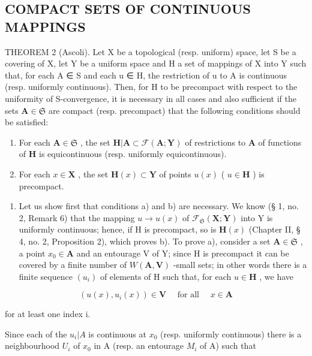 \subsection{COMPACT SETS OF CONTINUOUS MAPPINGS}

THEOREM 2 (Ascoli). Let X be a topological (resp. uniform) space, let S be a covering of X, let Y be a uniform space and H a set of mappings of X into Y such that, for each A ∈ S and each u ∈ H, the restriction of u to A is continuous (resp. uniformly continuous). Then, for H to be precompact with respect to the uniformity of S-convergence, it is necessary in all cases and also sufficient if the sets \(\mathbf{A} \in \mathfrak{S}\) are compact (resp. precompact) that the following conditions should be satisfied:

\begin{enumerate}
\def\labelenumi{\alph{enumi})}
\item
  For each \(\mathbf{A} \in \mathfrak{S}\) , the set \(\mathbf{H}|\mathbf{A} \subset \mathcal{F}(\mathbf{A};\mathbf{Y})\) of restrictions to \(\mathbf{A}\) of functions of \(\mathbf{H}\) is equicontinuous (resp. uniformly equicontinuous).
\item
  For each \(x \in \mathbf{X}\) , the set \(\mathbf{H}(x) \subset \mathbf{Y}\) of points \(u(x)\) ( \(u \in \mathbf{H}\) ) is precompact.
\end{enumerate}

\begin{enumerate}
\def\labelenumi{\arabic{enumi})}
\tightlist
\item
  Let us show first that conditions a) and b) are necessary. We know (§ 1, no. 2, Remark 6) that the mapping \(u \to u(x)\) of \(\mathcal{F}_{\mathfrak{S}}(\mathbf{X};\mathbf{Y})\) into Y is uniformly continuous; hence, if H is precompact, so is \(\mathbf{H}(x)\) (Chapter II, § 4, no. 2, Proposition 2), which proves b). To prove a), consider a set \(\mathbf{A} \in \mathfrak{S}\) , a point \(x_0 \in \mathbf{A}\) and an entourage V of Y; since H is precompact it can be covered by a finite number of \(W(\mathbf{A},\mathbf{V})\) -small sets; in other words there is a finite sequence \((u_i)\) of elements of H such that, for each \(u \in \mathbf{H}\) , we have
\end{enumerate}

\[
(u (x), u _ {i} (x)) \in \mathbf {V} \quad \text { for   all } \quad x \in \mathbf {A}\tag{4}
\]

for at least one index i.

Since each of the \(u_{i}|A\) is continuous at \(x_{0}\) (resp. uniformly continuous) there is a neighbourhood \(U_{i}\) of \(x_{0}\) in A (resp. an entourage \(M_{i}\) of A) such that

